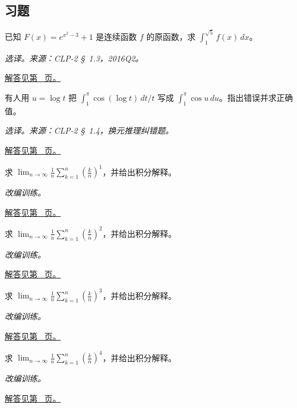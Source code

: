 \documentclass[UTF8,12pt,a4paper,fontset=fandol]{ctexart}
\begin{document}
\subsection{习题}
\begin{example}[由原函数信息计算定积分]\label{ex:c17q1}
已知 $F(x)=e^{x^2-3}+1$ 是连续函数 $f$ 的原函数，求 $\int_1^{\sqrt5}f(x)\,dx$。
\par\textit{选译。来源：CLP-2 \S~1.3，2016Q2。}\par\hyperref[ans:c17q1]{解答见第~\pageref{ans:c17q1} 页。}
\end{example}
\begin{example}[纠正换元后的上下限]\label{ex:c17q2}
有人用 $u=\log t$ 把 $\int_1^\pi \cos(\log t)\,dt/t$ 写成 $\int_1^\pi\cos u\,du$。指出错误并求正确值。
\par\textit{选译。来源：CLP-2 \S~1.4，换元推理纠错题。}\par\hyperref[ans:c17q2]{解答见第~\pageref{ans:c17q2} 页。}
\end{example}
\begin{example}[黎曼和的识别]\label{ex:c17q3}
求 $\displaystyle\lim_{n\to\infty}\frac1n\sum_{k=1}^n\left(\frac kn\right)^{1}$，并给出积分解释。
\par\textit{改编训练。}\par\hyperref[ans:c17q3]{解答见第~\pageref{ans:c17q3} 页。}
\end{example}
\begin{example}[黎曼和的识别]\label{ex:c17q4}
求 $\displaystyle\lim_{n\to\infty}\frac1n\sum_{k=1}^n\left(\frac kn\right)^{2}$，并给出积分解释。
\par\textit{改编训练。}\par\hyperref[ans:c17q4]{解答见第~\pageref{ans:c17q4} 页。}
\end{example}
\begin{example}[黎曼和的识别]\label{ex:c17q5}
求 $\displaystyle\lim_{n\to\infty}\frac1n\sum_{k=1}^n\left(\frac kn\right)^{3}$，并给出积分解释。
\par\textit{改编训练。}\par\hyperref[ans:c17q5]{解答见第~\pageref{ans:c17q5} 页。}
\end{example}
\begin{example}[黎曼和的识别]\label{ex:c17q6}
求 $\displaystyle\lim_{n\to\infty}\frac1n\sum_{k=1}^n\left(\frac kn\right)^{4}$，并给出积分解释。
\par\textit{改编训练。}\par\hyperref[ans:c17q6]{解答见第~\pageref{ans:c17q6} 页。}
\end{example}
\end{document}
